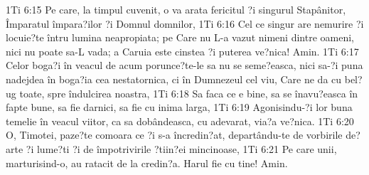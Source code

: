 1Ti 6:15  Pe care, la timpul cuvenit, o va arata fericitul ?i singurul Stapânitor, Împaratul împara?ilor ?i Domnul domnilor,
1Ti 6:16  Cel ce singur are nemurire ?i locuie?te întru lumina neapropiata; pe Care nu L-a vazut nimeni dintre oameni, nici nu poate sa-L vada; a Caruia este cinstea ?i puterea ve?nica! Amin.
1Ti 6:17  Celor boga?i în veacul de acum porunce?te-le sa nu se seme?easca, nici sa-?i puna nadejdea în boga?ia cea nestatornica, ci în Dumnezeul cel viu, Care ne da cu bel?ug toate, spre îndulcirea noastra,
1Ti 6:18  Sa faca ce e bine, sa se înavu?easca în fapte bune, sa fie darnici, sa fie cu inima larga,
1Ti 6:19  Agonisindu-?i lor buna temelie în veacul viitor, ca sa dobândeasca, cu adevarat, via?a ve?nica.
1Ti 6:20  O, Timotei, paze?te comoara ce ?i s-a încredin?at, departându-te de vorbirile de?arte ?i lume?ti ?i de împotrivirile ?tiin?ei mincinoase,
1Ti 6:21  Pe care unii, marturisind-o, au ratacit de la credin?a. Harul fie cu tine! Amin.


